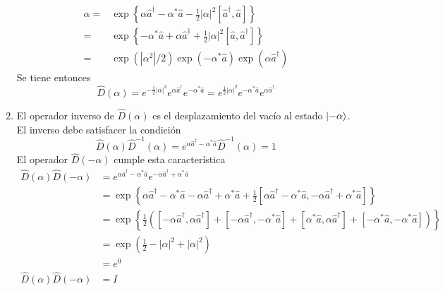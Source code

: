 \begin{enumerate}
\begin{align*}
\displaystyle{\alpha} = & \exp \left\{ \alpha \hat{a}^{\dagger} - \alpha^{*} \hat{a} - \frac{1}{2}|\alpha|^2[\hat{a}^{\dagger},\hat{a}] \right\}\\
= & \exp \left\{ - \alpha^{*} \hat{a} + \alpha \hat{a}^{\dagger}  + \frac{1}{2}|\alpha|^2[\hat{a},\hat{a}^{\dagger}] \right\} \\
= & \exp(|\alpha^2|/2)\exp(-\alpha^{*} \hat{a})\exp(\alpha\hat{a}^{\dagger})
\end{align*}
Se tiene entonces
\begin{equation*}
\hat{D}(\alpha)=e^{-\frac{1}{2}|\alpha|^2} e^{\alpha \hat{a}^\dagger} e^{-\alpha^* \hat{a}}  = e^{\frac{1}{2}|\alpha|^2} e^{-\alpha^* \hat{a}} e^{\alpha \hat{a}^\dagger}
\end{equation*}
\item El operador inverso de $\hat{D}(\alpha)$ es el desplazamiento del vacío al estado $\ket{-\alpha}$. El inverso debe satisfacer la condición
\begin{equation*}
\hat{D}(\alpha)\hat{D}^{-1}(\alpha) = e^{\alpha \hat{a}^{\dagger} - \alpha^{*}\hat{a}} \hat{D}^{-1}(\alpha) = 1
\end{equation*}
El operador $\hat{D}(-\alpha)$ cumple esta característica
\begin{align*}
\hat{D}(\alpha) \hat{D}(-\alpha) & = e^{\alpha \hat{a}^{\dagger} - \alpha^{*} \hat{a}} e^{-\alpha \hat{a}^{\dagger} + \alpha^{*} \hat{a}} \\
& = \exp{\left\{ \alpha \hat{a}^{\dagger} - \alpha^{*} \hat{a} -\alpha \hat{a}^{\dagger} + \alpha^{*} \hat{a} + \frac{1}{2}[ \alpha \hat{a}^{\dagger} - \alpha^{*} \hat{a}, -\alpha \hat{a}^{\dagger} + \alpha^{*} \hat{a} ] \right\}}                   \\
& = \exp{\left\{ \frac{1}{2}\left( [-\alpha \hat{a}^{\dagger}, \alpha\hat{a}^{\dagger}] + [-\alpha \hat{a}^{\dagger}, -\alpha^{*} \hat{a}] + [\alpha^{*} \hat{a}, \alpha\hat{a}^{\dagger}] + [-\alpha^{*} \hat{a}, -\alpha^{*}\hat{a}] \right) \right\}} \\
& = \exp{(\frac{1}{2}-|\alpha|^2 + |\alpha|^2)}                                                                                                                                      \\
& = e^{0}                                                                                                                                                                        \\
\hat{D}(\alpha) \hat{D}(-\alpha) & = I                                                                                                                                                                                    \\
\end{align*}



\end{enumerate}

